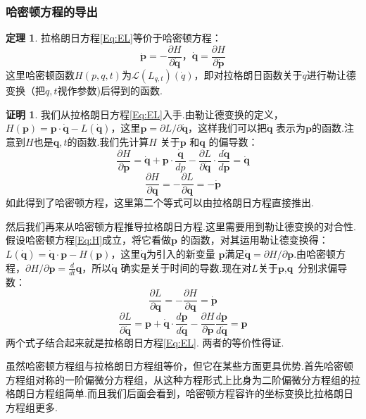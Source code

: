 \documentclass[UTF8,10.5pt,a4paper]{ctexart}
\numberwithin{equation}{section}
\theoremstyle{definition}
\newtheorem{thm}{定理\hspace{0.05pt}}[section]
\theoremstyle{definition}
\newtheorem*{pf}{证明}
\begin{document}
\subsubsection{哈密顿方程的导出}
\begin{thm}
拉格朗日方程\eqref{Eq:EL}等价于哈密顿方程：
\begin{equation}
\dot{\textbf{p}}=-\frac{\partial H}{\partial \dot{\textbf{q}}}\text{，} \dot{\textbf{q}}=\frac{\partial H}{\partial \dot{\textbf{p}}} \label{Eq:H}
\end{equation}
这里哈密顿函数$H(p,q,t)$为$\mathcal{L}(L_{q,t})(\dot{q})$，即对拉格朗日函数关于$\dot{q}$进行勒让德变换（把$q,t$视作参数)后得到的函数.
\end{thm}
\begin{pf}
我们从拉格朗日方程\eqref{Eq:EL}入手.由勒让德变换的定义，$H(\textbf{p})=\textbf{p}\cdot \dot{\textbf{q}}-L(\dot{\textbf{q}})\text{，这里} \textbf{p}=\partial L/\partial \dot{\textbf{q}}$，这样我们可以把$\dot{\textbf{q}}$ 表示为$\textbf{p}$的函数.注意到$H$也是$\textbf{q},t$的函数.我们先计算$H$ 关于$\textbf{p}$ 和$\textbf{q}$ 的偏导数：
$$\frac{\partial H}{\partial \textbf{p}}=\dot{\textbf{q}}+\textbf{p}\cdot \frac{\dot{\textbf{q}}}{dp}-\frac{\partial L}{\partial \dot{\textbf{q}}}\cdot\frac{d\dot{\textbf{q}}}{d\textbf{p}}=\dot{\textbf{q}}$$
$$\frac{\partial H}{\partial \textbf{q}}=-\frac{\partial L}{\partial \textbf{q}}=-\dot{\textbf{p}}$$
如此得到了哈密顿方程，这里第二个等式可以由拉格朗日方程直接推出.
\par 然后我们再来从哈密顿方程推导拉格朗日方程.这里需要用到勒让德变换的对合性.
假设哈密顿方程\eqref{Eq:H}成立，将它看做$\textbf{p}$ 的函数，对其运用勒让德变换得：$L(\dot{\textbf{q}})=\dot{\textbf{q}}\cdot \textbf{p}-H(\textbf{p})$，这里$\dot{\textbf{q}}$为引入的新变量
$\textbf{p}$满足$\dot{\textbf{q}}=\partial H/\partial \textbf{p}$.由哈密顿方程，$\partial H/\partial \textbf{p}=\frac{d}{dt}\textbf{q}$，所以$\dot{\textbf{q}}$ 确实是关于时间的导数.现在对$L$关于$\textbf{p},\textbf{q}$ 分别求偏导数：
$$\frac{\partial L}{\partial \textbf{q}}=-\frac{\partial H}{\partial \textbf{q}}=\dot{\textbf{p}}$$
$$\frac{\partial L}{\partial \dot{\textbf{q}}}=\textbf{p}+\dot{\textbf{q}}\cdot\frac{d\mathbf{p}}{d\dot{\textbf{q}}}-\frac{\partial H}{\partial \textbf{p}}\frac{d\mathbf{p}}{d\dot{\textbf{q}}}=\textbf{p}$$
两个式子结合起来就是拉格朗日方程\eqref{Eq:EL}. 两者的等价性得证.
\end{pf}
虽然哈密顿方程组与拉格朗日方程组等价，但它在某些方面更具优势.首先哈密顿方程组对称的一阶偏微分方程组，从这种方程形式上比身为二阶偏微分方程组的拉格朗日方程组简单.而且我们后面会看到，哈密顿方程容许的坐标变换比拉格朗日方程组更多.
\end{document}
